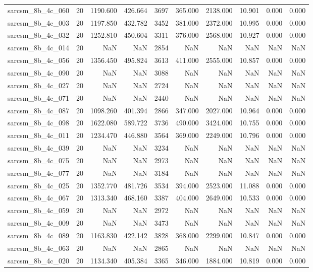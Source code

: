 \begin{tabular}{lrrrrrrrrr}
sarcsm\_8b\_4c\_060 & 20 & 1190.600 & 426.664 & 3697 & 365.000 & 2138.000 & 10.901 & 0.000 & 0.000 \\
sarcsm\_8b\_4c\_003 & 20 & 1197.850 & 432.782 & 3452 & 381.000 & 2372.000 & 10.995 & 0.000 & 0.000 \\
sarcsm\_8b\_4c\_032 & 20 & 1252.810 & 450.604 & 3311 & 376.000 & 2568.000 & 10.927 & 0.000 & 0.000 \\
sarcsm\_8b\_4c\_014 & 20 & NaN & NaN & 2854 & NaN & NaN & NaN & NaN & NaN \\
sarcsm\_8b\_4c\_056 & 20 & 1356.450 & 495.824 & 3613 & 411.000 & 2555.000 & 10.857 & 0.000 & 0.000 \\
sarcsm\_8b\_4c\_090 & 20 & NaN & NaN & 3088 & NaN & NaN & NaN & NaN & NaN \\
sarcsm\_8b\_4c\_027 & 20 & NaN & NaN & 2724 & NaN & NaN & NaN & NaN & NaN \\
sarcsm\_8b\_4c\_071 & 20 & NaN & NaN & 2440 & NaN & NaN & NaN & NaN & NaN \\
sarcsm\_8b\_4c\_087 & 20 & 1098.260 & 401.394 & 2866 & 347.000 & 2027.000 & 10.964 & 0.000 & 0.000 \\
sarcsm\_8b\_4c\_098 & 20 & 1622.080 & 589.722 & 3736 & 490.000 & 3424.000 & 10.755 & 0.000 & 0.000 \\
sarcsm\_8b\_4c\_011 & 20 & 1234.470 & 446.880 & 3564 & 369.000 & 2249.000 & 10.796 & 0.000 & 0.000 \\
sarcsm\_8b\_4c\_039 & 20 & NaN & NaN & 3234 & NaN & NaN & NaN & NaN & NaN \\
sarcsm\_8b\_4c\_075 & 20 & NaN & NaN & 2973 & NaN & NaN & NaN & NaN & NaN \\
sarcsm\_8b\_4c\_077 & 20 & NaN & NaN & 3184 & NaN & NaN & NaN & NaN & NaN \\
sarcsm\_8b\_4c\_025 & 20 & 1352.770 & 481.726 & 3534 & 394.000 & 2523.000 & 11.088 & 0.000 & 0.000 \\
sarcsm\_8b\_4c\_067 & 20 & 1313.340 & 468.160 & 3387 & 404.000 & 2649.000 & 10.533 & 0.000 & 0.000 \\
sarcsm\_8b\_4c\_059 & 20 & NaN & NaN & 2972 & NaN & NaN & NaN & NaN & NaN \\
sarcsm\_8b\_4c\_009 & 20 & NaN & NaN & 3473 & NaN & NaN & NaN & NaN & NaN \\
sarcsm\_8b\_4c\_089 & 20 & 1163.830 & 422.142 & 3828 & 368.000 & 2299.000 & 10.847 & 0.000 & 0.000 \\
sarcsm\_8b\_4c\_063 & 20 & NaN & NaN & 2865 & NaN & NaN & NaN & NaN & NaN \\
sarcsm\_8b\_4c\_020 & 20 & 1134.340 & 405.384 & 3365 & 346.000 & 1884.000 & 10.819 & 0.000 & 0.000 \\

\end{tabular}
